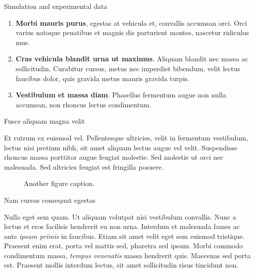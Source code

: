 \documentclass[final]{beamer}
\newlength{\colwidth}
\begin{document}
\begin{frame}[t]
\begin{columns}[t]
\begin{column}{\colwidth}
\begin{block}{Simulation and experimental data}
    \begin{enumerate}
      \item \textbf{Morbi mauris purus}, egestas at vehicula et, convallis
        accumsan orci. Orci varius natoque penatibus et magnis dis parturient
        montes, nascetur ridiculus mus.
      \item \textbf{Cras vehicula blandit urna ut maximus}. Aliquam blandit nec
        massa ac sollicitudin. Curabitur cursus, metus nec imperdiet bibendum,
        velit lectus faucibus dolor, quis gravida metus mauris gravida turpis.
      \item \textbf{Vestibulum et massa diam}. Phasellus fermentum augue non
        nulla accumsan, non rhoncus lectus condimentum.
    \end{enumerate}

  \end{block}

  \begin{block}{Fusce aliquam magna velit}

    Et rutrum ex euismod vel. Pellentesque ultricies, velit in fermentum
    vestibulum, lectus nisi pretium nibh, sit amet aliquam lectus augue vel
    velit. Suspendisse rhoncus massa porttitor augue feugiat molestie. Sed
    molestie ut orci nec malesuada. Sed ultricies feugiat est fringilla
    posuere.

    \begin{figure}
      \centering
      \caption{Another figure caption.}
    \end{figure}

  \end{block}

  \begin{block}{Nam cursus consequat egestas}

    Nulla eget sem quam. Ut aliquam volutpat nisi vestibulum convallis. Nunc a
    lectus et eros facilisis hendrerit eu non urna. Interdum et malesuada fames
    ac ante \textit{ipsum primis} in faucibus. Etiam sit amet velit eget sem
    euismod tristique. Praesent enim erat, porta vel mattis sed, pharetra sed
    ipsum. Morbi commodo condimentum massa, \textit{tempus venenatis} massa
    hendrerit quis. Maecenas sed porta est. Praesent mollis interdum lectus,
    sit amet sollicitudin risus tincidunt non.


\end{block}
\end{column}
\end{columns}
\end{frame}
\end{document}
